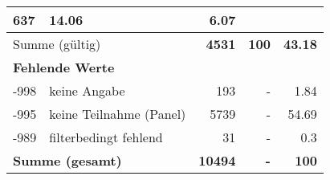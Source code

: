 \begin{longtable}{lXrrr}
       \num{637} &
       \num[round-mode=places,round-precision=2]{14.06} &
         \num[round-mode=places,round-precision=2]{6.07} \\
     \midrule
     \multicolumn{2}{l}{Summe (gültig)} &
       \textbf{\num{4531}} &
     \textbf{\num{100}} &
       \textbf{\num[round-mode=places,round-precision=2]{43.18}} \\
     \multicolumn{5}{l}{\textbf{Fehlende Werte}}\\
       -998 &
       keine Angabe &
         \num{193} &
        - &
         \num[round-mode=places,round-precision=2]{1.84} \\
       -995 &
       keine Teilnahme (Panel) &
         \num{5739} &
        - &
         \num[round-mode=places,round-precision=2]{54.69} \\
       -989 &
       filterbedingt fehlend &
         \num{31} &
        - &
         \num[round-mode=places,round-precision=2]{0.3} \\
     \midrule
     \multicolumn{2}{l}{\textbf{Summe (gesamt)}} &
          \textbf{\num{10494}} &
        \textbf{-} &
        \textbf{\num{100}} \\
     \bottomrule
     \end{longtable}
     

